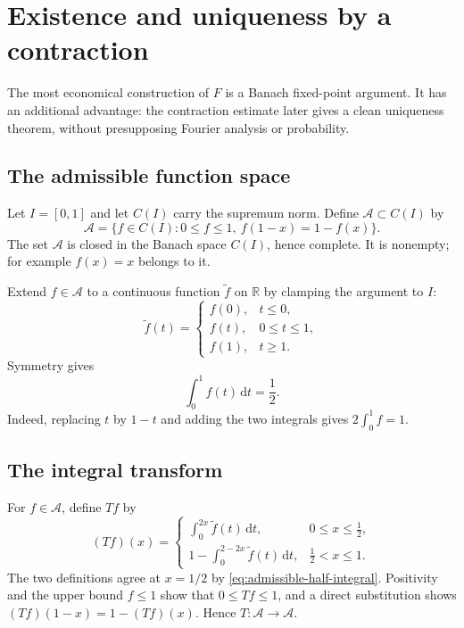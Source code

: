 \documentclass[11pt,oneside]{article}
\theoremstyle{definition}
\theoremstyle{remark}
\newcommand{\R}{\mathbb R}
\newcommand{\dd}{\,\mathrm d}
\begin{document}
\section{Existence and uniqueness by a contraction}
\label{sec:existence}

The most economical construction of $F$ is a Banach fixed-point argument.  It has an
additional advantage: the contraction estimate later gives a clean uniqueness theorem,
without presupposing Fourier analysis or probability.

\subsection{The admissible function space}

Let $I=[0,1]$ and let $C(I)$ carry the supremum norm.  Define $\mathcal A\subset C(I)$ by
\begin{equation}
 \mathcal A=\{f\in C(I):0\le f\le1,
   \ f(1-x)=1-f(x)\}.                                     \label{eq:admissible-space}
\end{equation}
The set $\mathcal A$ is closed in the Banach space $C(I)$, hence complete.  It is nonempty;
for example $f(x)=x$ belongs to it.

Extend $f\in\mathcal A$ to a continuous function $\widetilde f$ on $\R$ by clamping the
argument to $I$:
\begin{equation}
 \widetilde f(t)=
 \begin{cases}
  f(0),&t\le0,\\
  f(t),&0\le t\le1,\\
  f(1),&t\ge1.
 \end{cases}                                               \label{eq:clamped-extension}
\end{equation}
Symmetry gives
\begin{equation}
 \int_0^1 f(t)\dd t=\frac12.                              \label{eq:admissible-half-integral}
\end{equation}
Indeed, replacing $t$ by $1-t$ and adding the two integrals gives $2\int_0^1f=1$.

\subsection{The integral transform}

For $f\in\mathcal A$, define $Tf$ by
\begin{equation}
 (Tf)(x)=
 \begin{cases}
  \displaystyle\int_0^{2x}\widetilde f(t)\dd t,
       &0\le x\le\tfrac12,\\[1.2ex]
  \displaystyle 1-\int_0^{2-2x}\widetilde f(t)\dd t,
       &\tfrac12<x\le1.
 \end{cases}                                               \label{eq:fixed-transform}
\end{equation}
The two definitions agree at $x=1/2$ by
\eqref{eq:admissible-half-integral}.  Positivity and the upper bound $f\le1$ show that
$0\le Tf\le1$, and a direct substitution shows $(Tf)(1-x)=1-(Tf)(x)$.  Hence
$T:\mathcal A\to\mathcal A$.
\end{document}
